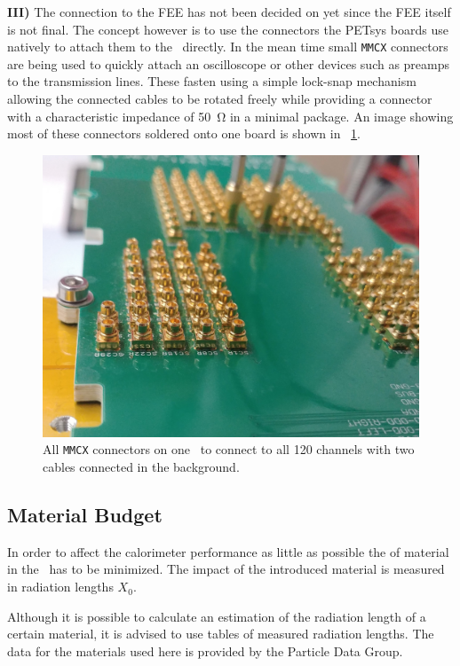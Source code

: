 \documentclass[../BTOF_summary.tex]{subfiles}
\begin{document}
\textbf{III)} The connection to the FEE has not been decided on yet since the FEE itself is not final.
The concept however is to use the connectors the PETsys boards use natively to attach them to the \railboard\ directly.
In the mean time small \texttt{MMCX} connectors are being used to quickly attach an oscilloscope or other devices such as preamps to the transmission lines.
These fasten using a simple lock-snap mechanism allowing the connected cables to be rotated freely while providing a connector with a characteristic impedance of \SI{50}{\ohm} in a minimal package.
An image showing most of these connectors soldered onto one board is shown in \fig ~\ref{fig:MMCX_connectors}.

\begin{figure}[htbp]
	\centering
	\includegraphics[width=.7\textwidth]{fig/MMCX_crop.jpg}
	\caption{All \texttt{MMCX} connectors on one \railboard\ to connect to all 120 channels with two cables connected in the background.}
	\label{fig:MMCX_connectors}
\end{figure}


\subsection{Material Budget}
\label{sec:MaterialBudgetDesign}

In order to affect the calorimeter performance as little as possible the of material in the \btof\ has to be minimized.
The impact of the introduced material is measured in radiation lengths $X_0$.

Although it is possible to calculate an estimation of the radiation length of a certain material, it is advised to use tables of measured radiation lengths.%
The data for the materials used here is provided by the Particle Data Group.%
\end{document}

